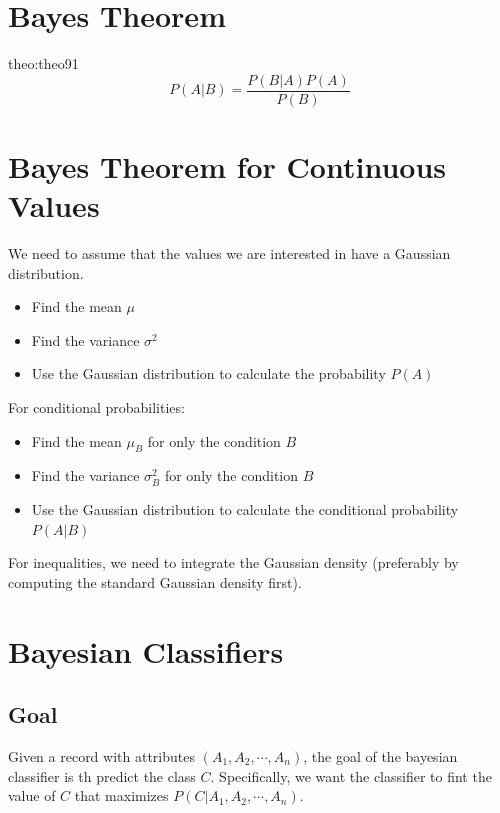 \section{Bayes Theorem}

\begin{theo}[]{theo:theo91}
\label{eq:bayes}
\[
P(A|B) = \frac{P(B|A) P(A)}{P(B)}
\]
\end{theo}

\section{Bayes Theorem for Continuous Values}

We need to assume that the values we are interested in have a Gaussian distribution.
\begin{itemize}
    \item Find the mean $\mu$
    \item Find the variance $\sigma^2$
    \item Use the Gaussian distribution to calculate the probability $P(A)$
\end{itemize}
\medskip

For conditional probabilities:
\begin{itemize}
    \item Find the mean $\mu_B$ for only the condition $B$
    \item Find the variance $\sigma^2_B$ for only the condition $B$
    \item Use the Gaussian distribution to calculate the conditional probability $P(A|B)$
\end{itemize}
\medskip

For inequalities, we need to integrate the Gaussian density (preferably by computing the standard Gaussian density first).

\section{Bayesian Classifiers}
\subsection{Goal}
Given a record with attributes $(A_1, A_2, \cdots, A_n)$, the goal of the bayesian classifier is th predict the class $C$.
Specifically, we want the classifier to fint the value of $C$ that maximizes $P(C|A_1, A_2, \cdots, A_n)$.

